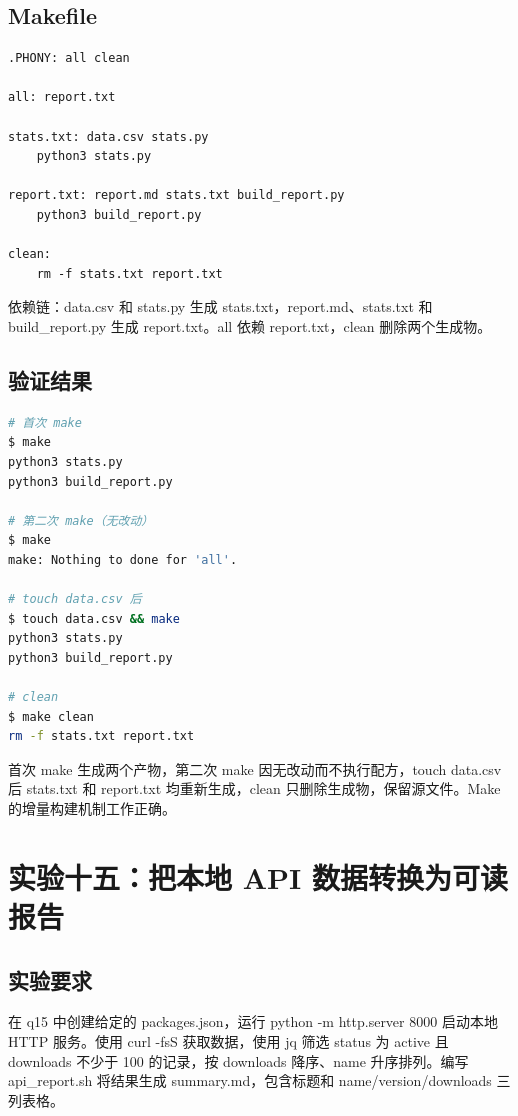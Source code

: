 \documentclass[UTF8]{ctexart}
\begin{document}
\subsection{Makefile}

\begin{lstlisting}
.PHONY: all clean

all: report.txt

stats.txt: data.csv stats.py
	python3 stats.py

report.txt: report.md stats.txt build_report.py
	python3 build_report.py

clean:
	rm -f stats.txt report.txt
\end{lstlisting}

依赖链：data.csv 和 stats.py 生成 stats.txt，report.md、stats.txt 和 build\_report.py 生成 report.txt。all 依赖 report.txt，clean 删除两个生成物。

\subsection{验证结果}

\begin{lstlisting}[language=bash]
# 首次 make
$ make
python3 stats.py
python3 build_report.py

# 第二次 make（无改动）
$ make
make: Nothing to done for 'all'.

# touch data.csv 后
$ touch data.csv && make
python3 stats.py
python3 build_report.py

# clean
$ make clean
rm -f stats.txt report.txt
\end{lstlisting}

首次 make 生成两个产物，第二次 make 因无改动而不执行配方，touch data.csv 后 stats.txt 和 report.txt 均重新生成，clean 只删除生成物，保留源文件。Make 的增量构建机制工作正确。

\section{实验十五：把本地 API 数据转换为可读报告}

\subsection{实验要求}

在 q15 中创建给定的 packages.json，运行 python -m http.server 8000 启动本地 HTTP 服务。使用 curl -fsS 获取数据，使用 jq 筛选 status 为 active 且 downloads 不少于 100 的记录，按 downloads 降序、name 升序排列。编写 api\_report.sh 将结果生成 summary.md，包含标题和 name/version/downloads 三列表格。
\end{document}
